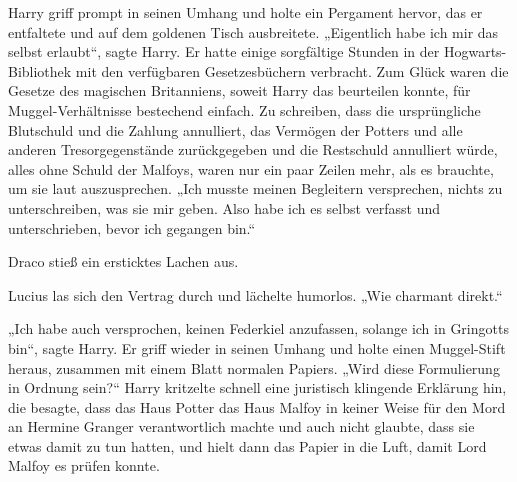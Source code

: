 Harry griff prompt in seinen Umhang und holte ein Pergament hervor, das er entfaltete und auf dem goldenen Tisch ausbreitete.
„Eigentlich habe ich mir das selbst erlaubt“, sagte Harry.
Er hatte einige sorgfältige Stunden in der Hogwarts-Bibliothek mit den verfügbaren Gesetzesbüchern verbracht. Zum Glück waren die Gesetze des magischen Britanniens, soweit Harry das beurteilen konnte, für Muggel-Verhältnisse bestechend einfach. Zu schreiben, dass die ursprüngliche Blutschuld und die Zahlung annulliert, das Vermögen der Potters und alle anderen Tresorgegenstände zurückgegeben und die Restschuld annulliert würde, alles ohne Schuld der Malfoys, waren nur ein paar Zeilen mehr, als es brauchte, um sie laut auszusprechen.
„Ich musste meinen Begleitern versprechen, nichts zu unterschreiben, was sie mir geben. Also habe ich es selbst verfasst und unterschrieben, bevor ich gegangen bin.“

Draco stieß ein ersticktes Lachen aus.

Lucius las sich den Vertrag durch und lächelte humorlos.
„Wie charmant direkt.“

„Ich habe auch versprochen, keinen Federkiel anzufassen, solange ich in Gringotts bin“, sagte Harry. Er griff wieder in seinen Umhang und holte einen Muggel-Stift heraus, zusammen mit einem Blatt normalen Papiers.
„Wird diese Formulierung in Ordnung sein?“
Harry kritzelte schnell eine juristisch klingende Erklärung hin, die besagte, dass das Haus Potter das Haus Malfoy in keiner Weise für den Mord an Hermine Granger verantwortlich machte und auch nicht glaubte, dass sie etwas damit zu tun hatten, und hielt dann das Papier in die Luft, damit Lord Malfoy es prüfen konnte.

